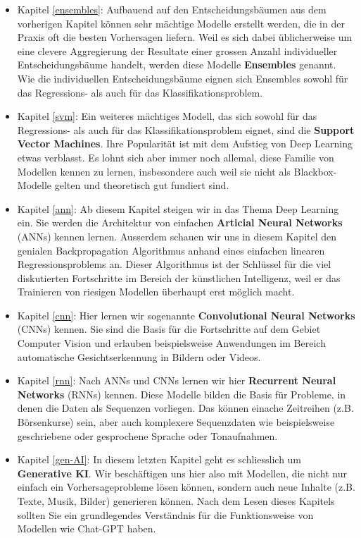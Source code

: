 \documentclass[
]{book}
\begin{document}
\begin{itemize}
\item
  Kapitel \ref{ensembles}: Aufbauend auf den Entscheidungsbäumen aus dem vorherigen Kapitel können sehr mächtige Modelle erstellt werden, die in der Praxis oft die besten Vorhersagen liefern. Weil es sich dabei üblicherweise um eine clevere Aggregierung der Resultate einer grossen Anzahl individueller Entscheidungsbäume handelt, werden diese Modelle \textbf{Ensembles} genannt. Wie die individuellen Entscheidungsbäume eignen sich Ensembles sowohl für das Regressions- als auch für das Klassifikationsproblem.
\item
  Kapitel \ref{svm}: Ein weiteres mächtiges Modell, das sich sowohl für das Regressions- als auch für das Klassifikationsproblem eignet, sind die \textbf{Support Vector Machines}. Ihre Popularität ist mit dem Aufstieg von Deep Learning etwas verblasst. Es lohnt sich aber immer noch allemal, diese Familie von Modellen kennen zu lernen, insbesondere auch weil sie nicht als Blackbox-Modelle gelten und theoretisch gut fundiert sind.
\item
  Kapitel \ref{ann}: Ab diesem Kapitel steigen wir in das Thema Deep Learning ein. Sie werden die Architektur von einfachen \textbf{Articial Neural Networks} (ANNs) kennen lernen. Ausserdem schauen wir uns in diesem Kapitel den genialen Backpropagation Algorithmus anhand eines einfachen linearen Regressionsproblems an. Dieser Algorithmus ist der Schlüssel für die viel diskutierten Fortschritte im Bereich der künstlichen Intelligenz, weil er das Trainieren von riesigen Modellen überhaupt erst möglich macht.
\item
  Kapitel \ref{cnn}: Hier lernen wir sogenannte \textbf{Convolutional Neural Networks} (CNNs) kennen. Sie sind die Basis für die Fortschritte auf dem Gebiet Computer Vision und erlauben beispielsweise Anwendungen im Bereich automatische Gesichtserkennung in Bildern oder Videos.
\item
  Kapitel \ref{rnn}: Nach ANNs und CNNs lernen wir hier \textbf{Recurrent Neural Networks} (RNNs) kennen. Diese Modelle bilden die Basis für Probleme, in denen die Daten als Sequenzen vorliegen. Das können einache Zeitreihen (z.B. Börsenkurse) sein, aber auch komplexere Sequenzdaten wie beispielsweise geschriebene oder gesprochene Sprache oder Tonaufnahmen.
\item
  Kapitel \ref{gen-AI}: In diesem letzten Kapitel geht es schliesslich um \textbf{Generative KI}. Wir beschäftigen uns hier also mit Modellen, die nicht nur einfach ein Vorhersageprobleme lösen können, sondern auch neue Inhalte (z.B. Texte, Musik, Bilder) generieren können. Nach dem Lesen dieses Kapitels sollten Sie ein grundlegendes Verständnis für die Funktionsweise von Modellen wie Chat-GPT haben.
\end{itemize}
\end{document}
